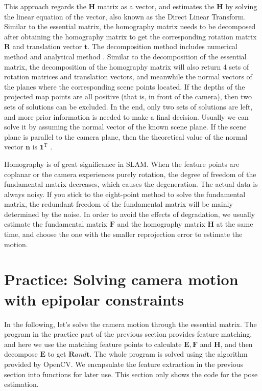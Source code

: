 This approach regards the $\mathbf{H}$ matrix as a vector, and estimates the $\mathbf{H}$ by solving the linear equation of the vector, also known as the Direct Linear Transform. Similar to the essential matrix, the homography matrix needs to be decomposed after obtaining the homography matrix to get the corresponding rotation matrix $\mathbf{R}$ and translation vector $\mathbf{t}$. The decomposition method includes numerical method \textsuperscript{\cite{faugeras1988motion, Zhang1996}} and analytical method \textsuperscript{\cite{malis2007deeper}}. Similar to the decomposition of the essential matrix, the decomposition of the homography matrix will also return 4 sets of rotation matrices and translation vectors, and meanwhile the normal vectors of the planes where the corresponding scene points located. If the depths of the projected map points are all positive (that is, in front of the camera), then two sets of solutions can be excluded. In the end, only two sets of solutions are left, and more prior information is needed to make a final decision. Usually we can solve it by assuming the normal vector of the known scene plane. If the scene plane is parallel to the camera plane, then the theoretical value of the normal vector $\mathbf{n}$ is $\mathbf{1}^\mathrm{T}$ .

Homography is of great significance in SLAM. When the feature points are coplanar or the camera experiences purely rotation, the degree of freedom of the fundamental matrix decreases, which causes the degeneration. The actual data is always noisy. If you stick to the eight-point method to solve the fundamental matrix, the redundant freedom of the fundamental matrix will be mainly determined by the noise. In order to avoid the effects of degradation, we usually estimate the fundamental matrix $\mathbf{F}$ and the homography matrix $\mathbf{H}$ at the same time, and choose the one with the smaller reprojection error to estimate the motion.

\section{Practice: Solving camera motion with epipolar constraints}
In the following, let's solve the camera motion through the essential matrix. The program in the practice part of the previous section provides feature matching, and here we use the matching feature points to calculate $\mathbf{E}, \mathbf{F}$ and $\mathbf{H}$, and then decompose $ \mathbf{E}$ to get $\mathbf{R} and \mathbf{t}$. The whole program is solved using the algorithm provided by OpenCV. We encapsulate the feature extraction in the previous section into functions for later use. This section only shows the code for the pose estimation.

